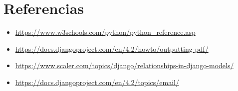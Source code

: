 \section{Referencias}
\begin{itemize}			
	\item \url{https://www.w3schools.com/python/python_reference.asp}
        \item \url{https://docs.djangoproject.com/en/4.2/howto/outputting-pdf/}
        \item\url{https://www.scaler.com/topics/django/relationships-in-django-models/}
        \item\url{https://docs.djangoproject.com/en/4.2/topics/email/}
\end{itemize}	